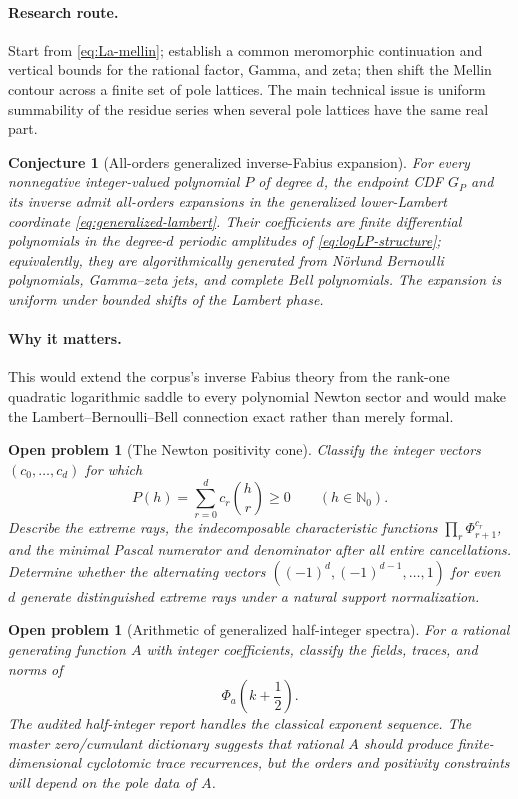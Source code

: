 \documentclass[11pt,oneside]{article}
\numberwithin{equation}{section}
\newtheorem{conjecture}[theorem]{Conjecture}
\newtheorem{problem}[theorem]{Open problem}
\theoremstyle{definition}
\theoremstyle{remark}
\newcommand{\N}{\mathbb N}
\begin{document}
\paragraph{Research route.}
Start from \eqref{eq:La-mellin}; establish a common meromorphic continuation and vertical
bounds for the rational factor, Gamma, and zeta; then shift the Mellin contour across a
finite set of pole lattices.  The main technical issue is uniform summability of the residue
series when several pole lattices have the same real part.

\begin{conjecture}[All-orders generalized inverse-Fabius expansion]
\label{conj:inverse-transseries}
For every nonnegative integer-valued polynomial $P$ of degree $d$, the endpoint CDF $G_P$ and
its inverse admit all-orders expansions in the generalized lower-Lambert coordinate
\eqref{eq:generalized-lambert}.  Their coefficients are finite differential polynomials in
the degree-$d$ periodic amplitudes of \eqref{eq:logLP-structure}; equivalently, they are
algorithmically generated from N\"orlund Bernoulli polynomials, Gamma--zeta jets, and
complete Bell polynomials.  The expansion is uniform under bounded shifts of the Lambert
phase.
\end{conjecture}

\paragraph{Why it matters.}
This would extend the corpus's inverse Fabius theory from the rank-one quadratic logarithmic
saddle to every polynomial Newton sector and would make the Lambert--Bernoulli--Bell
connection exact rather than merely formal.

\begin{problem}[The Newton positivity cone]
\label{prob:newton-cone}
Classify the integer vectors $(c_0,\ldots,c_d)$ for which
\[
 P(h)=\sum_{r=0}^{d}c_r\binom hr\ge0
 \qquad(h\in\N_0).
\]
Describe the extreme rays, the indecomposable characteristic functions
$\prod_r\Phi_{r+1}^{c_r}$, and the minimal Pascal numerator and denominator after all entire
cancellations.  Determine whether the alternating vectors
$((-1)^d,(-1)^{d-1},\ldots,1)$ for even $d$ generate distinguished extreme rays under a
natural support normalization.
\end{problem}

\begin{problem}[Arithmetic of generalized half-integer spectra]
For a rational generating function $A$ with integer coefficients, classify the fields,
traces, and norms of
\[
 \Phi_a\!\left(k+\frac12\right).
\]
The audited half-integer report handles the classical exponent sequence.  The master
zero/cumulant dictionary suggests that rational $A$ should produce finite-dimensional
cyclotomic trace recurrences, but the orders and positivity constraints will depend on the
pole data of $A$.
\end{problem}
\end{document}
